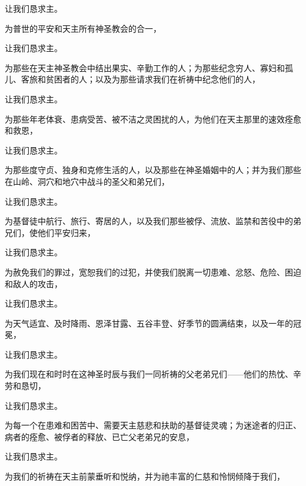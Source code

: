 让我们恳求主。\par

为普世的平安和天主所有神圣教会的合一，\par

让我们恳求主。\par

为那些在天主神圣教会中结出果实、辛勤工作的人；为那些纪念穷人、寡妇和孤儿、客旅和贫困者的人；以及为那些请求我们在祈祷中纪念他们的人，\par

让我们恳求主。\par

为那些年老体衰、患病受苦、被不洁之灵困扰的人，为他们在天主那里的速效痊愈和救恩，\par

让我们恳求主。\par

为那些度守贞、独身和克修生活的人，以及那些在神圣婚姻中的人；并为我们那些在山岭、洞穴和地穴中战斗的圣父和弟兄们，\par

让我们恳求主。\par

为基督徒中航行、旅行、寄居的人，以及我们那些被俘、流放、监禁和苦役中的弟兄们，使他们平安归来，\par

让我们恳求主。\par

为赦免我们的罪过，宽恕我们的过犯，并使我们脱离一切患难、忿怒、危险、困迫和敌人的攻击，\par

让我们恳求主。\par

为天气适宜、及时降雨、恩泽甘露、五谷丰登、好季节的圆满结束，以及一年的冠冕，\par

让我们恳求主。\par

为我们现在和时时在这神圣时辰与我们一同祈祷的父老弟兄们——他们的热忱、辛劳和恳切，\par

让我们恳求主。\par

为每一个在患难和困苦中、需要天主慈悲和扶助的基督徒灵魂；为迷途者的归正、病者的痊愈、被俘者的释放、已亡父老弟兄的安息，\par

让我们恳求主。\par

为我们的祈祷在天主前蒙垂听和悦纳，并为祂丰富的仁慈和怜悯倾降于我们，\par

